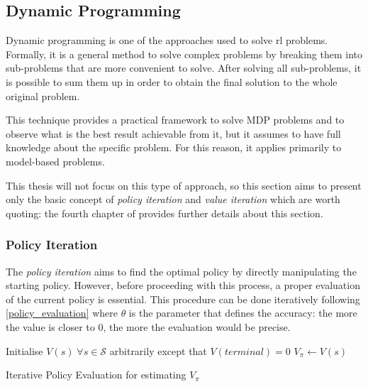 \subsection{Dynamic Programming}

Dynamic programming is one of the approaches used to solve \acrshort{rl} problems. Formally, it is a general method to solve complex problems by breaking them into sub-problems that are more convenient to solve. After solving all sub-problems, it is possible to sum them up in order to obtain the final solution to the whole original problem.

This technique provides a practical framework to solve MDP problems and to observe what is the best result achievable from it, but it assumes to have full knowledge about the specific problem. For this reason, it applies primarily to model-based problems.

This thesis will not focus on this type of approach, so this section aims to present only the basic concept of \textit{policy iteration} and \textit{value iteration} which are worth quoting: the fourth chapter of \cite{sutton2018reinforcement} provides further details about this section.

\subsubsection{Policy Iteration}

The \textit{policy iteration} aims to find the optimal policy by directly manipulating the starting policy. However, before proceeding with this process, a proper evaluation of the current policy is essential. This procedure can be done iteratively following \vref{policy_evaluation} where $\theta$ is the parameter that defines the accuracy: the more the value is closer to $0$, the more the evaluation would be precise.

\begin{algorithm}
	\SetAlgoLined
	\DontPrintSemicolon
	\LinesNumbered
	Initialise $V(s) \; \forall s \in \mathcal{S}$ arbitrarily except that $V(terminal) = 0$\;
	$V_\pi \leftarrow V(s)$\;
	\caption{Iterative Policy Evaluation for estimating $V_\pi$}
	\label{policy_evaluation}
\end{algorithm}

